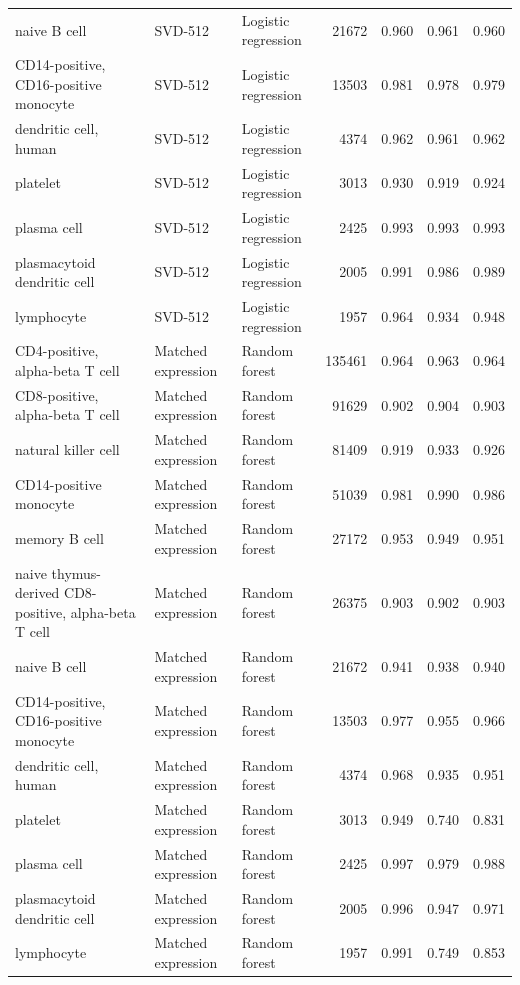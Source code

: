 {\begin{longtable}{>{\raggedright\arraybackslash}p{4.2cm}llrrrr}
naive B cell & SVD-512 & Logistic regression & 21672 & 0.960 & 0.961 & 0.960 \\
CD14-positive, CD16-positive monocyte & SVD-512 & Logistic regression & 13503 & 0.981 & 0.978 & 0.979 \\
dendritic cell, human & SVD-512 & Logistic regression & 4374 & 0.962 & 0.961 & 0.962 \\
platelet & SVD-512 & Logistic regression & 3013 & 0.930 & 0.919 & 0.924 \\
plasma cell & SVD-512 & Logistic regression & 2425 & 0.993 & 0.993 & 0.993 \\
plasmacytoid dendritic cell & SVD-512 & Logistic regression & 2005 & 0.991 & 0.986 & 0.989 \\
lymphocyte & SVD-512 & Logistic regression & 1957 & 0.964 & 0.934 & 0.948 \\
CD4-positive, alpha-beta T cell & Matched expression & Random forest & 135461 & 0.964 & 0.963 & 0.964 \\
CD8-positive, alpha-beta T cell & Matched expression & Random forest & 91629 & 0.902 & 0.904 & 0.903 \\
natural killer cell & Matched expression & Random forest & 81409 & 0.919 & 0.933 & 0.926 \\
CD14-positive monocyte & Matched expression & Random forest & 51039 & 0.981 & 0.990 & 0.986 \\
memory B cell & Matched expression & Random forest & 27172 & 0.953 & 0.949 & 0.951 \\
naive thymus-derived CD8-positive, alpha-beta T cell & Matched expression & Random forest & 26375 & 0.903 & 0.902 & 0.903 \\
naive B cell & Matched expression & Random forest & 21672 & 0.941 & 0.938 & 0.940 \\
CD14-positive, CD16-positive monocyte & Matched expression & Random forest & 13503 & 0.977 & 0.955 & 0.966 \\
dendritic cell, human & Matched expression & Random forest & 4374 & 0.968 & 0.935 & 0.951 \\
platelet & Matched expression & Random forest & 3013 & 0.949 & 0.740 & 0.831 \\
plasma cell & Matched expression & Random forest & 2425 & 0.997 & 0.979 & 0.988 \\
plasmacytoid dendritic cell & Matched expression & Random forest & 2005 & 0.996 & 0.947 & 0.971 \\
lymphocyte & Matched expression & Random forest & 1957 & 0.991 & 0.749 & 0.853 \\

\end{longtable}}
